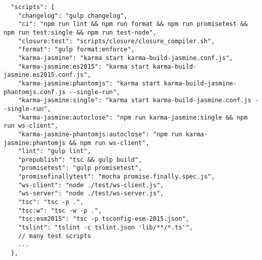 \begin{verbatim}
  "scripts": {
    "changelog": "gulp changelog",
    "ci": "npm run lint && npm run format && npm run promisetest && npm run test:single && npm run test-node",
    "closure:test": "scripts/closure/closure_compiler.sh",
    "format": "gulp format:enforce",
    "karma-jasmine": "karma start karma-build-jasmine.conf.js",
    "karma-jasmine:es2015": "karma start karma-build-jasmine.es2015.conf.js",
    "karma-jasmine:phantomjs": "karma start karma-build-jasmine-phantomjs.conf.js --single-run",
    "karma-jasmine:single": "karma start karma-build-jasmine.conf.js --single-run",
    "karma-jasmine:autoclose": "npm run karma-jasmine:single && npm run ws-client",
    "karma-jasmine-phantomjs:autoclose": "npm run karma-jasmine:phantomjs && npm run ws-client",
    "lint": "gulp lint",
    "prepublish": "tsc && gulp build",
    "promisetest": "gulp promisetest",
    "promisefinallytest": "mocha promise.finally.spec.js",
    "ws-client": "node ./test/ws-client.js",
    "ws-server": "node ./test/ws-server.js",
    "tsc": "tsc -p .",
    "tsc:w": "tsc -w -p .",
    "tsc:esm2015": "tsc -p tsconfig-esm-2015.json",
    "tslint": "tslint -c tslint.json 'lib/**/*.ts'",
    // many test scripts
    ...
  },
\end{verbatim}

